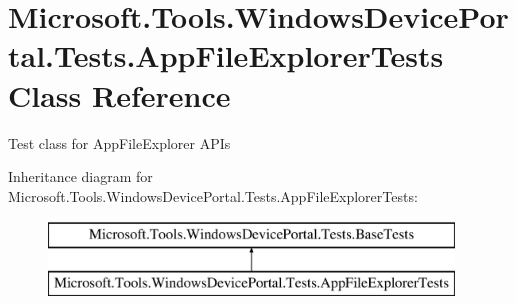 \hypertarget{class_microsoft_1_1_tools_1_1_windows_device_portal_1_1_tests_1_1_app_file_explorer_tests}{}\section{Microsoft.\+Tools.\+Windows\+Device\+Portal.\+Tests.\+App\+File\+Explorer\+Tests Class Reference}
\label{class_microsoft_1_1_tools_1_1_windows_device_portal_1_1_tests_1_1_app_file_explorer_tests}


Test class for App\+File\+Explorer A\+P\+Is  


Inheritance diagram for Microsoft.\+Tools.\+Windows\+Device\+Portal.\+Tests.\+App\+File\+Explorer\+Tests\+:\begin{figure}[H]
\begin{center}
\leavevmode
\includegraphics[height=2.000000cm]{class_microsoft_1_1_tools_1_1_windows_device_portal_1_1_tests_1_1_app_file_explorer_tests}
\end{center}
\end{figure}
